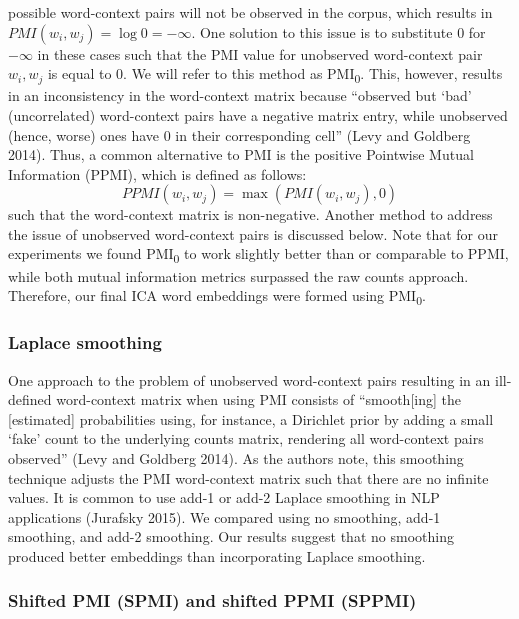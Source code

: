 \documentclass{article}
\begin{document}
possible word-context pairs will not be observed in the corpus, which
results in \(PMI(w_i, w_j) = \log0 = - \infty\). One solution to this
issue is to substitute 0 for \(- \infty\) in these cases such that the
PMI value for unobserved word-context pair \(w_i, w_j\) is equal to 0.
We will refer to this method as PMI\textsubscript{0}. This, however,
results in an inconsistency in the word-context matrix because
``observed but `bad' (uncorrelated) word-context pairs have a negative
matrix entry, while unobserved (hence, worse) ones have 0 in their
corresponding cell'' (Levy and Goldberg 2014). Thus, a common
alternative to PMI is the positive Pointwise Mutual Information (PPMI),
which is defined as follows: \[PPMI(w_i, w_j) = \max(PMI(w_i, w_j), 0)\]
such that the word-context matrix is non-negative. Another method to
address the issue of unobserved word-context pairs is discussed below.
Note that for our experiments we found PMI\textsubscript{0} to work
slightly better than or comparable to PPMI, while both mutual
information metrics surpassed the raw counts approach. Therefore, our
final ICA word embeddings were formed using PMI\textsubscript{0}.

\hypertarget{laplace-smoothing}{%
\subsubsection{Laplace smoothing}\label{laplace-smoothing}}

One approach to the problem of unobserved word-context pairs resulting
in an ill-defined word-context matrix when using PMI consists of
``smooth{[}ing{]} the {[}estimated{]} probabilities using, for instance,
a Dirichlet prior by adding a small `fake' count to the underlying
counts matrix, rendering all word-context pairs observed'' (Levy and
Goldberg 2014). As the authors note, this smoothing technique adjusts
the PMI word-context matrix such that there are no infinite values. It
is common to use add-1 or add-2 Laplace smoothing in NLP applications
(Jurafsky 2015). We compared using no smoothing, add-1 smoothing, and
add-2 smoothing. Our results suggest that no smoothing produced better
embeddings than incorporating Laplace smoothing.

\hypertarget{shifted-pmi-spmi-and-shifted-ppmi-sppmi}{%
\subsubsection{Shifted PMI (SPMI) and shifted PPMI
(SPPMI)}\label{shifted-pmi-spmi-and-shifted-ppmi-sppmi}}
\end{document}
